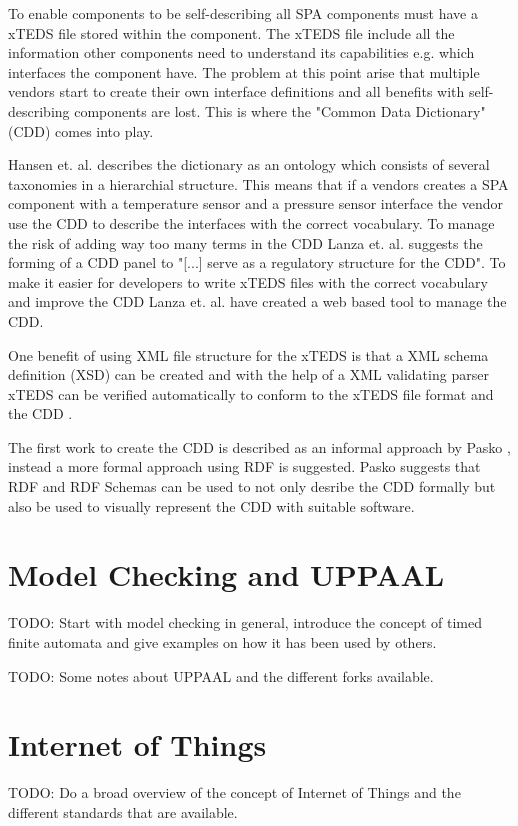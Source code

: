 
To enable components to be self-describing all SPA components must have a xTEDS
file stored within the component. The xTEDS file include all the information
other components need to understand its capabilities e.g. which interfaces the
component have. The problem at this point arise that multiple vendors start to
create their own interface definitions and all benefits with self-describing
components are lost. This is where the "Common Data Dictionary" (CDD) comes
into play.

Hansen et. al.  \cite{hansen2012} describes the dictionary as an ontology which
consists of several taxonomies in a hierarchial structure. This means that if a
vendors creates a SPA component with a temperature sensor and a pressure sensor
interface the vendor use the CDD to describe the interfaces with the correct
vocabulary. To manage the risk of adding way too many terms in the CDD Lanza
et. al. \cite{lanza2010} suggests the forming of a CDD panel to "[...] serve as
a regulatory structure for the CDD". To make it easier for developers to write
xTEDS files with the correct vocabulary and improve the CDD Lanza et. al.
\cite{lanza2010} have created a web based tool to manage the CDD.

One benefit of using XML file structure for the xTEDS is that a XML schema
definition (XSD) can be created and with the help of a XML validating parser
xTEDS can be verified automatically to conform to the xTEDS file format and the
CDD \cite{lanza2010}.

The first work to create the CDD is described as an informal approach by Pasko
\cite{pasko2011}, instead a more formal approach using RDF is suggested. Pasko
suggests that RDF and RDF Schemas can be used to not only desribe the CDD
formally but also be used to visually represent the CDD with suitable software.


\section{Model Checking and UPPAAL}
TODO: Start with model checking in general, introduce the concept of timed
finite automata and give examples on how it has been used by others.

TODO: Some notes about UPPAAL and the different forks available.

\section{Internet of Things}
TODO: Do a broad overview of the concept of Internet of Things and the
different standards that are available.
